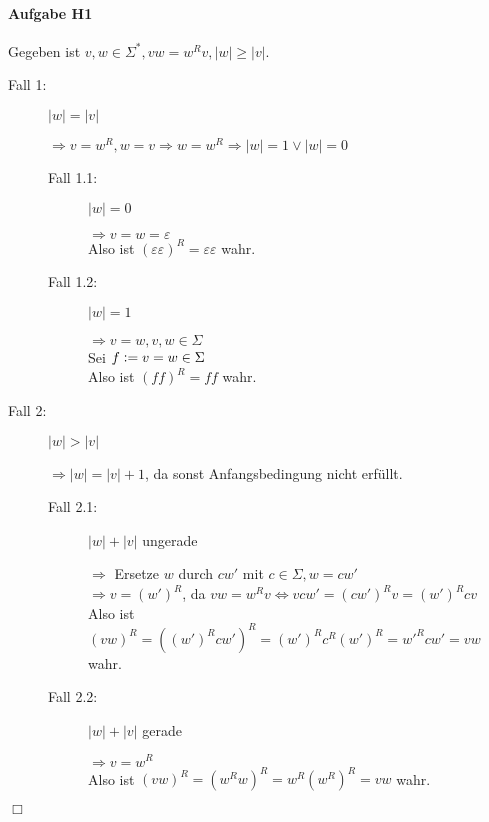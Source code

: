 \documentclass[11pt]{article}
\begin{document}

\paragraph{Aufgabe H1}
Gegeben ist $v,w\in\Sigma^{*}, vw=w^{R}v, \left\lvert w \right\lvert \geq  \left\lvert v \right\lvert$.
\begin{description}
\item[Fall 1:] $\left\lvert w \right\lvert = \left\lvert v \right\lvert$\par\nobreak
	$\Rightarrow v=w^{R}, w=v \Rightarrow w=w^{R} \Rightarrow \left\lvert w \right\lvert =1 \lor \left\lvert w \right\lvert=0$
	\begin{description}
	\item[Fall 1.1:] $\left\lvert w \right\lvert = 0$\par\nobreak
		$\Rightarrow v=w=\varepsilon$
		\\Also ist $(\varepsilon\varepsilon)^{R} = \varepsilon\varepsilon$ wahr.
	\item[Fall 1.2:] $\left\lvert w \right\lvert = 1$\par\nobreak
		$\Rightarrow v=w, v,w\in\Sigma$
		\\Sei $f \vcentcolon = v=w\in\Sigma$
		\\Also ist $(ff)^{R}=ff$ wahr.
	\end{description}
\item[Fall 2:] $\left\lvert w \right\lvert > \left\lvert v \right\lvert$\par\nobreak
	$\Rightarrow \left\lvert w \right\lvert = \left\lvert v \right\lvert +1$, da sonst Anfangsbedingung nicht erfüllt.
	\begin{description}
	\item[Fall 2.1:] $\left\lvert w \right\lvert + \left\lvert v \right\lvert$ ungerade\par\nobreak
		$\Rightarrow$ Ersetze $w$ durch $cw'$ mit $c\in\Sigma, w=cw'$
		\\ $\Rightarrow v=(w')^{R}$, da $vw=w^{R}v \Leftrightarrow vcw'=(cw')^{R}v=(w')^{R}cv$
		\\Also ist $(vw)^{R}=((w')^{R}cw')^{R}=(w')^{R}c^{R}(w')^{R}={w'}^{R}cw'=vw$ wahr.
	\item[Fall 2.2:] $\left\lvert w \right\lvert + \left\lvert v \right\lvert$ gerade\par\nobreak
	$\Rightarrow v=w^{R}$
	\\Also ist $(vw)^{R}=(w^{R}w)^{R}=w^{R}(w^{R})^{R}=vw$ wahr.
	\end{description}
\end{description}\hfill $\Box$
\end{document}
